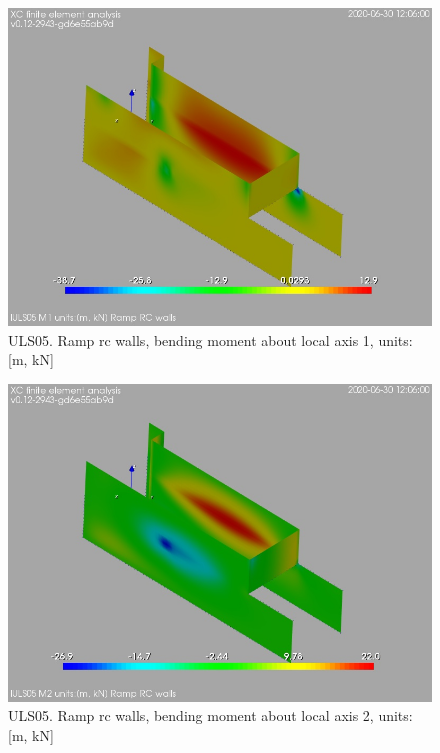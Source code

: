\begin{figure}
\begin{center}
\includegraphics[width=\linewidth]{ramp_wall/resLC/text/graphics/resSimplLC/lULS05wallsM1}
\caption{ULS05. Ramp rc walls, bending moment about local axis 1, units:[m, kN]}
\end{center}
\end{figure}
\begin{figure}
\begin{center}
\includegraphics[width=\linewidth]{ramp_wall/resLC/text/graphics/resSimplLC/lULS05wallsM2}
\caption{ULS05. Ramp rc walls, bending moment about local axis 2, units:[m, kN]}
\end{center}
\end{figure}
